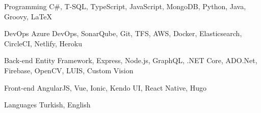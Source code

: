 
\begin{cvskills}

  \cvskill
    {Programming} %
    {C\#, T-SQL, TypeScript, JavaScript, MongoDB, Python, Java, Groovy, \LaTeX} %

  \cvskill
    {DevOps} %
    {Azure DevOps, SonarQube, Git, TFS, AWS, Docker, Elasticsearch, CircleCI, Netlify, Heroku} %

  \cvskill
    {Back-end} %
    {Entity Framework, Express, Node.js, GraphQL, .NET Core, ADO.Net, Firebase, OpenCV, LUIS, Custom Vision} %

  \cvskill
    {Front-end} %
    {AngularJS, Vue, Ionic, Kendo UI, React Native, Hugo} %

  \cvskill
    {Languages} %
    {Turkish, English} %

\end{cvskills}
